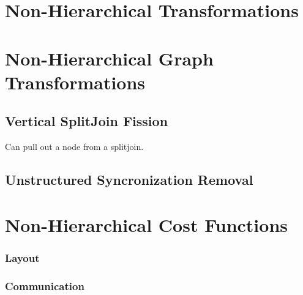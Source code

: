 \section{Non-Hierarchical  Transformations}

\section{Non-Hierarchical Graph Transformations}

\subsection{Vertical SplitJoin Fission}

Can pull out a node from a splitjoin.

\subsection{}

\subsection{Unstructured Syncronization Removal}


\section{Non-Hierarchical Cost Functions}

\subsubsection{Layout}

\subsubsection{Communication}





